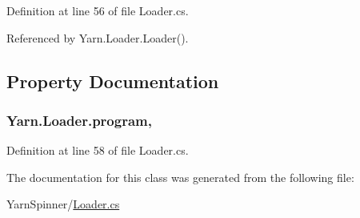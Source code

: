 Definition at line 56 of file Loader.\-cs.



Referenced by Yarn.\-Loader.\-Loader().



\subsection{Property Documentation}
\hypertarget{a00123_a6d8296076823c0c082df9024367f4860}{
\subsubsection[{program}]{ Yarn.\-Loader.\-program\hspace{0.3cm}{\ttfamily [get]}, {\ttfamily [set]}}}\label{a00123_a6d8296076823c0c082df9024367f4860}


Definition at line 58 of file Loader.\-cs.



The documentation for this class was generated from the following file\-:\begin{DoxyCompactItemize}
\item 
Yarn\-Spinner/\hyperlink{a00294}{Loader.\-cs}\end{DoxyCompactItemize}
